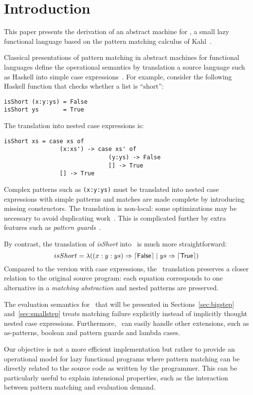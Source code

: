 \section{Introduction}

This paper presents the derivation of an abstract machine for \lambdaPMC, a small
lazy functional language based on the pattern matching calculus
of Kahl~\cite{kahl_2004}.

Classical presentations of pattern matching in abstract machines for
functional languages define the operational semantics by translation
a source language such as Haskell
into simple case expressions~\cite{spj_1987,jones_1992}. For
example, consider the following Haskell function that checks whether a
list is ``short'':
\begin{verbatim}
isShort (x:y:ys) = False
isShort ys       = True
\end{verbatim}
The translation into nested case expressions is:
\begin{verbatim}
isShort xs = case xs of
                (x:xs') -> case xs' of
                              (y:ys) -> False
                              [] -> True
                [] -> True
\end{verbatim}
Complex patterns such as \verb|(x:y:ys)| must be translated into 
nested case expressions with simple patterns and
matches are made complete by introducing missing constructors.
The translation is non-local: some optimizations may be 
necessary to avoid duplicating work~\cite{spj_1987}.
This is complicated further by extra features
such as \emph{pattern guards}~\cite{haskell_2010_report}.

By contrast, the translation of \textit{isShort} into \lambdaPMC\ is much more
straightforward:
\[
  isShort = \lambda ((x:y:ys) \Rightarrow \left\lceil \textsf{False}\right\rceil \mid
                     ys \Rightarrow \left\lceil \textsf{True}\right\rceil)
\]
Compared to the version with case expressions, the \lambdaPMC\ translation
preserves a closer relation to the original source program: each
equation corresponds to one alternative in a \emph{matching
  abstraction} and nested patterns are preserved. 

The evaluation semantics for \lambdaPMC\ that will be presented in
Sections~\ref{sec:bigstep} and~\ref{sec:smallstep} treats matching
failure explicitly instead of implicitly thought nested case
expressions. Furthermore, \lambdaPMC\ can easily handle
other extensions, such as as-patterns, boolean and
pattern guards and lambda cases.

Our objective is not a more efficient implementation but rather
to provide an operational model for lazy functional
programs where pattern matching can be directly related to the source
code as written by the programmer. This can be particularly useful to
explain intensional properties, such as the interaction between
pattern matching and evaluation demand.




